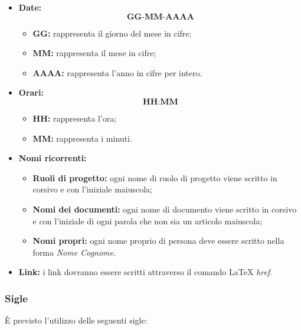 \documentclass[NormediProgetto.tex]{subfiles}
\begin{document}
\begin{itemize}

\item{\textbf{Date:}}  \[\textbf{GG-MM-AAAA}\]
\begin{itemize}
\item{\textbf{GG:}} rappresenta il giorno del mese in cifre;
\item{\textbf{MM:}} rappresenta il mese in cifre;
\item{\textbf{AAAA:}} rappresenta l'anno in cifre per intero.

\end{itemize}

\item{\textbf{Orari:}} \[\textbf{HH:MM}\]
\begin{itemize}
\item{\textbf{HH:}} rappresenta l'ora;
\item{\textbf{MM:}} rappresenta i minuti.
\end{itemize}

\item{\textbf{Nomi ricorrenti:}}
\begin{itemize}
\item{\textbf{Ruoli di progetto:}} ogni nome di ruolo di progetto viene scritto in corsivo e con l’iniziale maiuscola;
\item{\textbf{Nomi dei documenti:}}  ogni nome di documento viene scritto in corsivo e con l’iniziale di ogni parola che non sia un articolo maiuscola;
\item{\textbf{Nomi propri:}} ogni nome proprio di persona deve essere scritto nella forma \textit{Nome Cognome}.
\end{itemize}

\item{\textbf{Link:}} i link dovranno essere scritti attraverso il comando \LaTeX{} \textit{href}.
\end{itemize}

\subsubsection{Sigle}

È previsto l’utilizzo delle seguenti sigle: 
\end{document}
